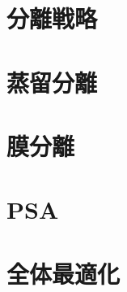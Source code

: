 \documentclass[11pt,aspectratio=43,dvipsnames]{beamer}
\begin{document}
\setcounter{framenumber}{9}
\section{分離戦略}
\section{蒸留分離}
\section{膜分離}
\section{PSA}
\section{全体最適化}
\end{document}
